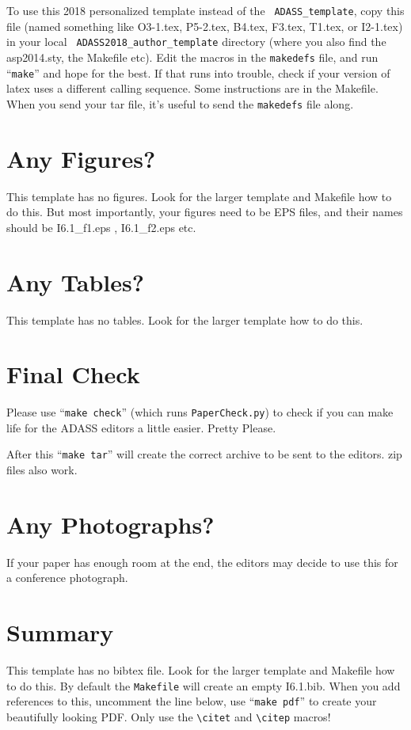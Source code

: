 \documentclass[11pt,twoside]{article}
\begin{document}
To use this 2018 personalized template instead of the {\tt
  ADASS\_template}, copy this file (named something like O3-1.tex,
P5-2.tex, B4.tex, F3.tex, T1.tex, or I2-1.tex) in your local {\tt
  ADASS2018\_author\_template} directory (where you also find the
asp2014.sty, the Makefile etc).  Edit the macros in the {\tt makedefs}
file, and run ``{\tt make}'' and hope for the best.  If that runs into
trouble, check if your version of latex uses a different calling
sequence.  Some instructions are in the Makefile. When you send your
tar file, it's useful to send the {\tt makedefs} file along.

\section{Any Figures?}

This template has no figures. Look for the larger template and
Makefile how to do this. But most importantly, your figures need to
be EPS files, and their names should be I6.1\_f1.eps ,
I6.1\_f2.eps  etc.

\section{Any Tables?}

This template has no tables. Look for the larger template
how to do this. 

\section{Final Check}

Please use ``{\tt make check}'' (which runs {\tt PaperCheck.py}) to
check if you can make life for the ADASS editors a little
easier. Pretty Please.

After this ``{\tt make tar}'' will create the correct archive to be sent to
the editors. zip files also work.

\section{Any Photographs?}

If your paper has enough room at the end, the editors may decide to use this
for a conference photograph.

\section{Summary}

This template has no bibtex file.  Look for the larger template and
Makefile how to do this. By default the {\tt Makefile} will create an
empty I6.1.bib. When you add references to this, uncomment the
line \verb++ below, use ``{\tt make pdf}'' to create
your beautifully looking PDF. Only use the
\verb"\citet" and \verb"\citep" macros!



% 

\end{document}
